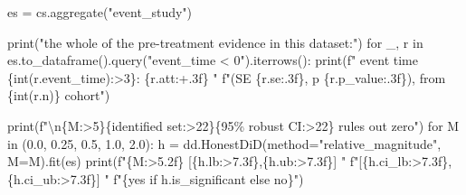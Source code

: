 \documentclass[
  letterpaper,
  10pt,
  twoside,
  openright,
  numbers=noenddot,
  chapterprefix=true]{scrbook}
\newenvironment{Shaded}{}{}
\newcommand{\BuiltInTok}[1]{\textcolor[rgb]{0.84,0.23,0.29}{#1}}
\newcommand{\CharTok}[1]{\textcolor[rgb]{0.01,0.18,0.38}{#1}}
\newcommand{\ControlFlowTok}[1]{\textcolor[rgb]{0.84,0.23,0.29}{#1}}
\newcommand{\FloatTok}[1]{\textcolor[rgb]{0.00,0.36,0.77}{#1}}
\newcommand{\KeywordTok}[1]{\textcolor[rgb]{0.84,0.23,0.29}{#1}}
\newcommand{\NormalTok}[1]{\textcolor[rgb]{0.14,0.16,0.18}{#1}}
\newcommand{\OperatorTok}[1]{\textcolor[rgb]{0.14,0.16,0.18}{#1}}
\newcommand{\SpecialCharTok}[1]{\textcolor[rgb]{0.00,0.36,0.77}{#1}}
\newcommand{\SpecialStringTok}[1]{\textcolor[rgb]{0.01,0.18,0.38}{#1}}
\newcommand{\StringTok}[1]{\textcolor[rgb]{0.01,0.18,0.38}{#1}}
\begin{document}
\label{check-honest}
\begin{Shaded}
\begin{Highlighting}[]
\NormalTok{es }\OperatorTok{=}\NormalTok{ cs.aggregate(}\StringTok{"event\_study"}\NormalTok{)}

\BuiltInTok{print}\NormalTok{(}\StringTok{"the whole of the pre{-}treatment evidence in this dataset:"}\NormalTok{)}
\ControlFlowTok{for}\NormalTok{ \_, r }\KeywordTok{in}\NormalTok{ es.to\_dataframe().query(}\StringTok{"event\_time \textless{} 0"}\NormalTok{).iterrows():}
    \BuiltInTok{print}\NormalTok{(}\SpecialStringTok{f"   event time }\SpecialCharTok{\{}\BuiltInTok{int}\NormalTok{(r.event\_time)}\SpecialCharTok{:\textgreater{}3\}}\SpecialStringTok{: }\SpecialCharTok{\{}\NormalTok{r}\SpecialCharTok{.}\NormalTok{att}\SpecialCharTok{:+.3f\}}\SpecialStringTok{  "}
          \SpecialStringTok{f"(SE }\SpecialCharTok{\{}\NormalTok{r}\SpecialCharTok{.}\NormalTok{se}\SpecialCharTok{:.3f\}}\SpecialStringTok{, p }\SpecialCharTok{\{}\NormalTok{r}\SpecialCharTok{.}\NormalTok{p\_value}\SpecialCharTok{:.3f\}}\SpecialStringTok{), from }\SpecialCharTok{\{}\BuiltInTok{int}\NormalTok{(r.n)}\SpecialCharTok{\}}\SpecialStringTok{ cohort"}\NormalTok{)}

\BuiltInTok{print}\NormalTok{(}\SpecialStringTok{f"}\CharTok{\textbackslash{}n}\SpecialCharTok{\{}\StringTok{\textquotesingle{}M\textquotesingle{}}\SpecialCharTok{:\textgreater{}5\}\{}\StringTok{\textquotesingle{}identified set\textquotesingle{}}\SpecialCharTok{:\textgreater{}22\}\{}\StringTok{\textquotesingle{}95}\SpecialCharTok{\% r}\StringTok{obust CI\textquotesingle{}}\SpecialCharTok{:\textgreater{}22\}}\SpecialStringTok{   rules out zero"}\NormalTok{)}
\ControlFlowTok{for}\NormalTok{ M }\KeywordTok{in}\NormalTok{ (}\FloatTok{0.0}\NormalTok{, }\FloatTok{0.25}\NormalTok{, }\FloatTok{0.5}\NormalTok{, }\FloatTok{1.0}\NormalTok{, }\FloatTok{2.0}\NormalTok{):}
\NormalTok{    h }\OperatorTok{=}\NormalTok{ dd.HonestDiD(method}\OperatorTok{=}\StringTok{"relative\_magnitude"}\NormalTok{, M}\OperatorTok{=}\NormalTok{M).fit(es)}
    \BuiltInTok{print}\NormalTok{(}\SpecialStringTok{f"}\SpecialCharTok{\{}\NormalTok{M}\SpecialCharTok{:\textgreater{}5.2f\}}\SpecialStringTok{   [}\SpecialCharTok{\{}\NormalTok{h}\SpecialCharTok{.}\NormalTok{lb}\SpecialCharTok{:\textgreater{}7.3f\}}\SpecialStringTok{,}\SpecialCharTok{\{}\NormalTok{h}\SpecialCharTok{.}\NormalTok{ub}\SpecialCharTok{:\textgreater{}7.3f\}}\SpecialStringTok{]     "}
          \SpecialStringTok{f"[}\SpecialCharTok{\{}\NormalTok{h}\SpecialCharTok{.}\NormalTok{ci\_lb}\SpecialCharTok{:\textgreater{}7.3f\}}\SpecialStringTok{,}\SpecialCharTok{\{}\NormalTok{h}\SpecialCharTok{.}\NormalTok{ci\_ub}\SpecialCharTok{:\textgreater{}7.3f\}}\SpecialStringTok{]   "}
          \SpecialStringTok{f"}\SpecialCharTok{\{}\StringTok{\textquotesingle{}yes\textquotesingle{}} \ControlFlowTok{if}\NormalTok{ h}\SpecialCharTok{.}\NormalTok{is\_significant }\ControlFlowTok{else} \StringTok{\textquotesingle{}no\textquotesingle{}}\SpecialCharTok{\}}\SpecialStringTok{"}\NormalTok{)}
\end{Highlighting}
\end{Shaded}
\end{document}

